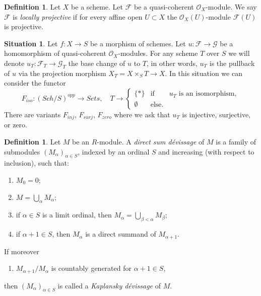 \documentclass{amsart}
\theoremstyle{plain}
\theoremstyle{definition}
\newtheorem{definition}[subsection]{Definition}
\newtheorem{situation}[subsection]{Situation}
\theoremstyle{remark}
\numberwithin{equation}{subsection}
\def\Sch{\mathit{Sch}}
\begin{document}
\begin{definition}
\label{properties-definition-locally-projective}
Let $X$ be a scheme. Let $\mathcal{F}$ be a quasi-coherent
$\mathcal{O}_X$-module. We say $\mathcal{F}$ is {\it locally projective}
if for every affine open $U \subset X$ the $\mathcal{O}_X(U)$-module
$\mathcal{F}(U)$ is projective.
\end{definition}

\begin{situation}
\label{situation-iso}
Let $f : X \to S$ be a morphism of schemes.
Let $u : \mathcal{F} \to \mathcal{G}$ be a homomorphism of
quasi-coherent $\mathcal{O}_X$-modules. For any scheme $T$ over
$S$ we will denote $u_T : \mathcal{F}_T \to \mathcal{G}_T$ the
base change of $u$ to $T$, in other words, $u_T$ is the pullback
of $u$ via the projection morphism $X_T = X \times_S T \to X$.
In this situation we can consider the functor
\begin{equation}
\label{equation-iso}
F_{iso} : (\Sch/S)^{opp} \longrightarrow \textit{Sets}, \quad
T \longrightarrow \left\{
\begin{matrix}
\{*\} & \text{if} & u_T \text{ is an isomorphism}, \\
\emptyset & \text{else.} &
\end{matrix}
\right.
\end{equation}
There are variants $F_{inj}$, $F_{surj}$, $F_{zero}$ where we ask that
$u_T$ is injective, surjective, or zero.
\end{situation}

\begin{definition}
\label{algebra-definition-devissage}
Let $M$ be an $R$-module.  A {\it direct sum d\'evissage} of $M$ is a family
of submodules $(M_{\alpha})_{\alpha \in S}$, indexed by an ordinal $S$ and
increasing (with respect to inclusion), such that:
\begin{enumerate}
\item[(0)] $M_0 = 0$;
\item[(1)] $M = \bigcup_{\alpha} M_{\alpha}$;
\item[(2)] if $\alpha \in S$ is a limit ordinal, then $M_{\alpha} =
\bigcup_{\beta < \alpha} M_{\beta}$;
\item[(3)] if $\alpha + 1 \in S$, then $M_{\alpha}$ is a direct summand of
$M_{\alpha + 1}$.
\end{enumerate}
If moreover
\begin{enumerate}
\item[(4)] $M_{\alpha + 1}/M_{\alpha}$ is countably generated for
$\alpha + 1 \in S$,
\end{enumerate}
then $(M_{\alpha})_{\alpha \in S}$ is called a {\it Kaplansky d\'evissage}
of $M$.
\end{definition}
\end{document}

